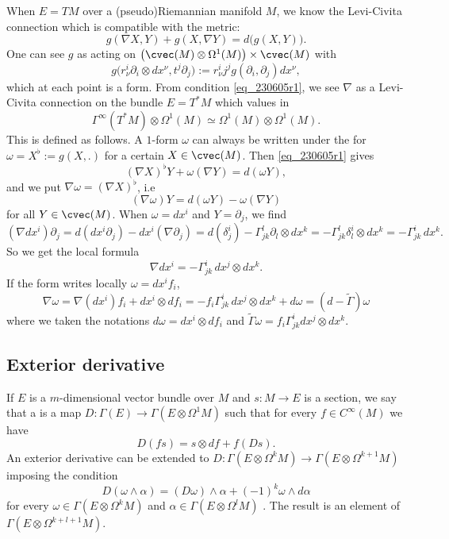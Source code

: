 When $E=TM$ over a (pseudo)Riemannian manifold $M$, we know the Levi-Civita connection which is compatible with the metric:
\begin{equation}\label{eq_230605r1}
	g(\nabla X,Y)+g(X,\nabla Y)=d\big( g(X,Y) \big).
\end{equation}
One can see $g$ as acting on $\big( \cvec(M)\otimes\Omega^1(M) \big)\times\cvec(M)$ with
\[
	g\big( r^i_{\nu}\partial_i\otimes dx^{\nu},t^j\partial_j \big):=r^i_{\nu}j^jg(\partial_i,\partial_j)dx^{\nu},
\]
which at each point is a form. From condition \eqref{eq_230605r1}, we see $\nabla$ as a Levi-Civita connection on the bundle $E=T^*M$ which values in
\[
	\Gamma^{\infty}(T^*M)\otimes\Omega^1(M)\simeq\Omega^1(M)\otimes\Omega^1(M).
\]
This is defined as follows. A $1$-form $\omega$ can always be written under the for $\omega=X^{\flat}:=g(X,.)$ for a certain $X\in\cvec(M)$. Then  \eqref{eq_230605r1} gives
\[
	(\nabla X)^{\flat}Y+\omega(\nabla Y)=d(\omega Y),
\]
and we put $\nabla\omega=(\nabla X)^{\flat}$, i.e
\begin{equation}
	(\nabla\omega)Y=d(\omega Y)-\omega(\nabla Y)
\end{equation}
for all $Y\in\cvec(M)$. When $\omega=dx^i$ and $Y=\partial_j$, we find
\begin{equation}
	(\nabla dx^i)\partial_j=d(dx^i\partial_j)-dx^i(\nabla\partial_j)
	=d(\delta^i_j)-\Gamma_{jk}^{l}\partial_l\otimes dx^k
	=-\Gamma_{jk}^{l}\delta_l^i\otimes dx^k
	=-\Gamma_{jk}^{i}\,dx^k.
\end{equation}
So we get the local formula
\begin{equation}
	\nabla dx^i=-\Gamma_{jk}^{i}\,dx^j\otimes dx^k.
\end{equation}
If the form writes locally $\omega=dx^if_i$,
\begin{equation}
	\nabla\omega=\nabla(dx^i)f_i+dx^i\otimes df_i
	=-f_i\Gamma_{jk}^{i}\,dx^j\otimes dx^k+d\omega
	=(d-\tilde\Gamma)\omega
\end{equation}
where we taken the notations $d\omega=dx^i\otimes df_i$ and $\tilde\Gamma\omega=f_i\Gamma_{jk}^{i}dx^j\otimes dx^k$.

\subsection{Exterior derivative}

If $E$ is a $m$-dimensional vector bundle over $M$ and $s\colon M\to E$ is a section, we say that a  is a map $D\colon \Gamma(E)\to \Gamma(E\otimes \Omega^1M)$ such that for every $f\in C^{\infty}(M)$ we have
\[
	D(fs)=s\otimes df+f(Ds).
\]
An exterior derivative can be extended to $D\colon \Gamma(E\otimes\Omega^kM)\to \Gamma(E\otimes\Omega^{k+1}M)$ imposing the condition
\begin{equation}		\label{EqExtExtDerrk}
	D(\omega\wedge\alpha)=(D\omega)\wedge\alpha+(-1)^k\omega\wedge d\alpha
\end{equation}
for every $\omega\in\Gamma(E\otimes\Omega^kM)$ and $\alpha\in\Gamma(E\otimes\Omega^lM)$ . The result is an element of $\Gamma(E\otimes\Omega^{k+l+1}M)$.


